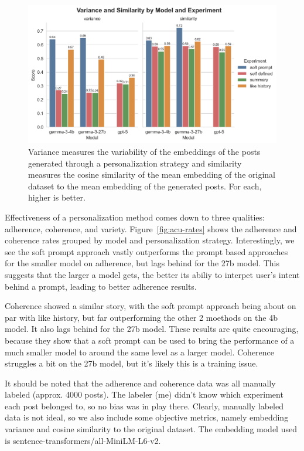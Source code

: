 \documentclass[11pt]{article}
\begin{document}
\begin{figure}[t!]
\centering
\includegraphics[width=\linewidth]{visuals/variance-similarity-by-model-experiment.png}
\caption{Variance measures the variability of the embeddings of the posts generated through a personalization strategy and similarity measures the cosine similarity of the mean embedding of the original dataset to the mean embedding of the generated posts. For each, higher is better.}
\label{fig:variance-similarity}
\end{figure}


Effectiveness of a personalization method comes down to three qualities: adherence, coherence, and variety. Figure~\ref{fig:acu-rates} shows the adherence and coherence rates grouped by model and personalization strategy. Interestingly, we see the soft prompt approach vastly outperforms the prompt based approaches for the smaller model on adherence, but lags behind for the 27b model. This suggests that the larger a model gets, the better its abiliy to interpet user's intent behind a prompt, leading to better adherence results. 

Coherence showed a similar story, with the soft prompt approach being about on par with like history, but far outperforming the other 2 moethods on the 4b model. It also lags behind for the 27b model. These results are quite encouraging, because they show that a soft prompt can be used to bring the performance of a much smaller model to around the same level as a larger model. Coherence struggles a bit on the 27b model, but it's likely this is a training issue.

It should be noted that the adherence and coherence data was all manually labeled (approx. 4000 posts). The labeler (me) didn't know which experiment each post belonged to, so no bias was in play there. Clearly, manually labeled data is not ideal, so we also include some objective metrics, namely embedding variance and cosine similarity to the original dataset. The embedding model used is sentence-transformers/all-MiniLM-L6-v2. 
\end{document}
